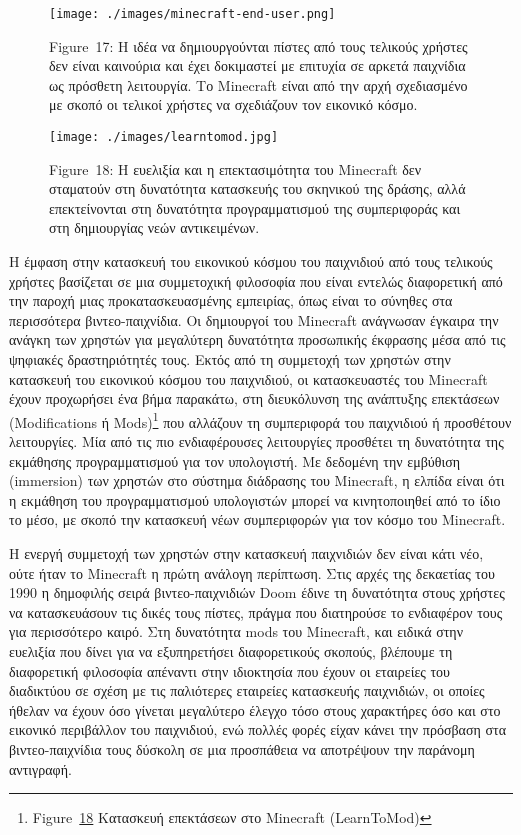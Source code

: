 \documentclass[
]{article}
\begin{document}
\leavevmode{}%
\begin{figure}
\hypertarget{fig:minecraft-end-user}{%
\centering
\texttt{[image: ./images/minecraft-end-user.png]}
\caption{Figure~17: Η ιδέα να δημιουργούνται πίστες από τους τελικούς
χρήστες δεν είναι καινούρια και έχει δοκιμαστεί με επιτυχία σε αρκετά
παιχνίδια ως πρόσθετη λειτουργία. Το Minecraft είναι από την αρχή
σχεδιασμένο με σκοπό οι τελικοί χρήστες να σχεδιάζουν τον εικονικό
κόσμο.}\label{fig:minecraft-end-user}
}
\end{figure}

\leavevmode{}%
\begin{figure}
\hypertarget{fig:learntomod}{%
\centering
\texttt{[image: ./images/learntomod.jpg]}
\caption{Figure~18: Η ευελιξία και η επεκτασιμότητα του Minecraft δεν
σταματούν στη δυνατότητα κατασκευής του σκηνικού της δράσης, αλλά
επεκτείνονται στη δυνατότητα προγραμματισμού της συμπεριφοράς και στη
δημιουργίας νεών αντικειμένων.}\label{fig:learntomod}
}
\end{figure}

Η έμφαση στην κατασκευή του εικονικού κόσμου του παιχνιδιού από τους
τελικούς χρήστες βασίζεται σε μια συμμετοχική φιλοσοφία που είναι
εντελώς διαφορετική από την παροχή μιας προκατασκευασμένης εμπειρίας,
όπως είναι το σύνηθες στα περισσότερα βιντεο-παιχνίδια. Οι δημιουργοί
του Minecraft ανάγνωσαν έγκαιρα την ανάγκη των χρηστών για μεγαλύτερη
δυνατότητα προσωπικής έκφρασης μέσα από τις ψηφιακές δραστηριότητές
τους. Εκτός από τη συμμετοχή των χρηστών στην κατασκευή του εικονικού
κόσμου του παιχνιδιού, οι κατασκευαστές του Minecraft έχουν προχωρήσει
ένα βήμα παρακάτω, στη διευκόλυνση της ανάπτυξης επεκτάσεων
(Modifications ή Mods)\footnote{Figure~\protect\hyperlink{fig:learntomod}{18}
  Κατασκευή επεκτάσεων στο Minecraft (LearnToMod)} που αλλάζουν τη
συμπεριφορά του παιχνιδιού ή προσθέτουν λειτουργίες. Μία από τις πιο
ενδιαφέρουσες λειτουργίες προσθέτει τη δυνατότητα της εκμάθησης
προγραμματισμού για τον υπολογιστή. Με δεδομένη την εμβύθιση (immersion)
των χρηστών στο σύστημα διάδρασης του Minecraft, η ελπίδα είναι ότι η
εκμάθηση του προγραμματισμού υπολογιστών μπορεί να κινητοποιηθεί από το
ίδιο το μέσο, με σκοπό την κατασκευή νέων συμπεριφορών για τον κόσμο του
Minecraft.

Η ενεργή συμμετοχή των χρηστών στην κατασκευή παιχνιδιών δεν είναι κάτι
νέο, ούτε ήταν το Minecraft η πρώτη ανάλογη περίπτωση. Στις αρχές της
δεκαετίας του 1990 η δημοφιλής σειρά βιντεο-παιχνιδιών Doom έδινε τη
δυνατότητα στους χρήστες να κατασκευάσουν τις δικές τους πίστες, πράγμα
που διατηρούσε το ενδιαφέρον τους για περισσότερο καιρό. Στη δυνατότητα
mods του Minecraft, και ειδικά στην ευελιξία που δίνει για να
εξυπηρετήσει διαφορετικούς σκοπούς, βλέπουμε τη διαφορετική φιλοσοφία
απέναντι στην ιδιοκτησία που έχουν οι εταιρείες του διαδικτύου σε σχέση
με τις παλιότερες εταιρείες κατασκευής παιχνιδιών, οι οποίες ήθελαν να
έχουν όσο γίνεται μεγαλύτερο έλεγχο τόσο στους χαρακτήρες όσο και στο
εικονικό περιβάλλον του παιχνιδιού, ενώ πολλές φορές είχαν κάνει την
πρόσβαση στα βιντεο-παιχνίδια τους δύσκολη σε μια προσπάθεια να
αποτρέψουν την παράνομη αντιγραφή.
\end{document}
